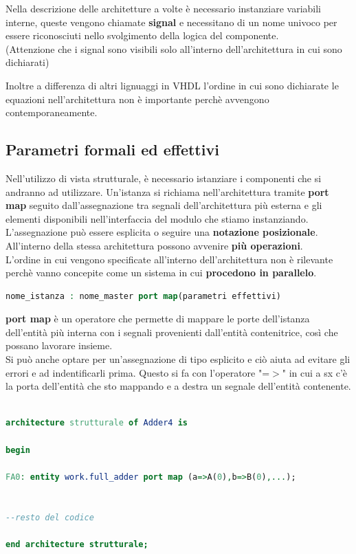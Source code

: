 \documentclass[a4paper]{book}
\begin{document}
Nella descrizione delle architetture a volte è necessario instanziare variabili interne, queste vengono chiamate \textbf{signal} e necessitano di un nome univoco per essere riconosciuti nello svolgimento della logica del componente.\\
(Attenzione che i signal sono visibili solo all'interno dell'architettura in cui sono dichiarati)

Inoltre a differenza di altri lignuaggi in VHDL l'ordine in cui sono dichiarate le equazioni nell'architettura non è importante perchè avvengono contemporaneamente.

\subsection{Parametri formali ed effettivi}

Nell'utilizzo di vista strutturale, è necessario istanziare i componenti che si andranno ad utilizzare. 
Un'istanza si richiama nell'architettura tramite \textbf{port map} seguito dall'assegnazione tra segnali dell'architettura più esterna e gli elementi disponibili nell'interfaccia del modulo che stiamo instanziando. L'assegnazione può essere esplicita o seguire una \textbf{notazione posizionale}.
All'interno della stessa architettura possono avvenire \textbf{più operazioni}.\\
L'ordine in cui vengono specificate all'interno dell'architettura non è rilevante perchè vanno concepite come un sistema in cui \textbf{procedono in parallelo}.\\
\begin{lstlisting}[language=VHDL]
nome_istanza : nome_master port map(parametri effettivi)
\end{lstlisting}\vspace{\baselineskip}
\textbf{port map} è un operatore che permette di mappare le porte dell'istanza dell'entità più interna con i segnali provenienti dall'entità contenitrice, così che possano lavorare insieme.\\
Si può anche optare per un'assegnazione di tipo esplicito e ciò aiuta ad evitare gli errori e ad indentificarli prima.
Questo si fa con l'operatore "=$>$" in cui a sx c'è la porta dell'entità che sto mappando e a destra un segnale dell'entità contenente.

\begin{lstlisting}[language=VHDL]

architecture strutturale of Adder4 is

begin

FA0: entity work.full_adder port map (a=>A(0),b=>B(0),...);


--resto del codice

end architecture strutturale;


\end{lstlisting}
\end{document}
